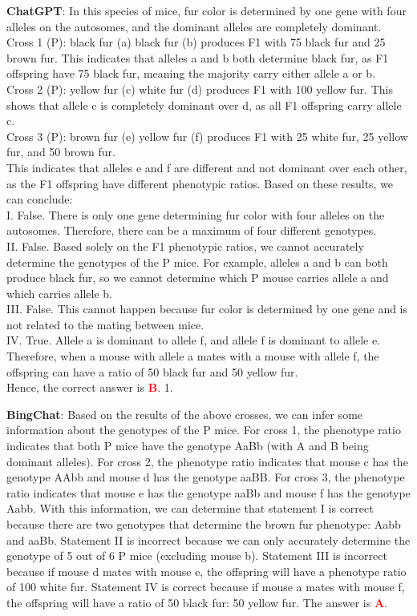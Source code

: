 \documentclass{article}
\begin{document}
{\begin{mdframed}[linewidth=1pt,linecolor=red]
		\textbf{ChatGPT}: In this species of mice, fur color is determined by one gene with four alleles on the autosomes, and the dominant alleles are completely dominant.\\
		Cross 1 (P):  black fur (a)   black fur (b) produces F1 with 75 black fur and 25 brown fur. This indicates that alleles a and b both determine black fur, as F1 offspring have 75 black fur, meaning the majority carry either allele a or b.\\
		Cross 2 (P):  yellow fur (c)   white fur (d) produces F1 with 100 yellow fur.
		This shows that allele c is completely dominant over d, as all F1 offspring carry allele c.\\
		Cross 3 (P):  brown fur (e)   yellow fur (f) produces F1 with 25 white fur, 25 yellow fur, and 50 brown fur.\\
		This indicates that alleles e and f are different and not dominant over each other, as the F1 offspring have different phenotypic ratios.
		Based on these results, we can conclude:\\
		I. False. There is only one gene determining fur color with four alleles on the autosomes. Therefore, there can be a maximum of four different genotypes.\\
		II. False. Based solely on the F1 phenotypic ratios, we cannot accurately determine the genotypes of the P mice. For example, alleles a and b can both produce black fur, so we cannot determine which P mouse carries allele a and which carries allele b.\\
		III. False. This cannot happen because fur color is determined by one gene and is not related to the mating between mice.\\
		IV. True. Allele a is dominant to allele f, and allele f is dominant to allele e. Therefore, when a mouse with allele a mates with a mouse with allele f, the offspring can have a ratio of 50 black fur and 50 yellow fur.\\
		Hence, the correct answer is \textcolor{red}{\textbf{B}}. 1.
		
		\textbf{BingChat}: Based on the results of the above crosses, we can infer some information about the genotypes of the P mice. For cross 1, the  phenotype ratio indicates that both P mice have the genotype AaBb (with A and B being dominant alleles). For cross 2, the  phenotype ratio indicates that mouse c has the genotype AAbb and mouse d has the genotype aaBB. For cross 3, the  phenotype ratio indicates that mouse e has the genotype aaBb and mouse f has the genotype Aabb. With this information, we can determine that statement I is correct because there are two genotypes that determine the brown fur phenotype: Aabb and aaBb. Statement II is incorrect because we can only accurately determine the genotype of 5 out of 6 P mice (excluding mouse b). Statement III is incorrect because if mouse d mates with mouse e, the offspring will have a phenotype ratio of 100 white fur. Statement IV is correct because if mouse a mates with mouse f, the offspring will have a ratio of 50 black fur: 50 yellow fur. The answer is \textcolor{red}{\textbf{A}}. 
		

\end{mdframed}}
\end{document}
